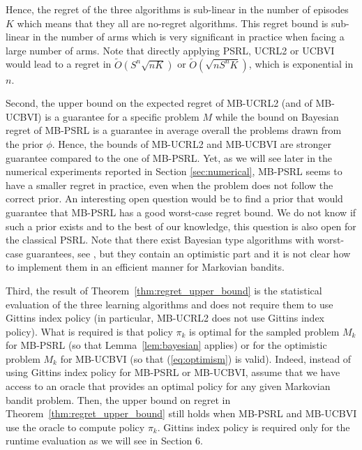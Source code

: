Hence, the regret of the three algorithms is sub-linear in the number of episodes $K$ which means that they all  are no-regret algorithms. This regret bound is sub-linear in the number of arms which is very significant in practice when facing a large number of arms. Note that directly applying PSRL, UCRL2 or UCBVI would lead to a regret in   $\tilde{O}\left(S^n\sqrt{nK}\right)$ or $\tilde{O}\left(\sqrt{nS^nK}\right)$,  which is exponential in $n$.

Second, the upper bound on the expected regret of MB-UCRL2 (and of MB-UCBVI) is a guarantee for a specific problem $M$ while the bound on Bayesian regret of MB-PSRL is a guarantee in average overall the problems drawn from the prior $\phi$. Hence, the bounds of MB-UCRL2 and MB-UCBVI are stronger guarantee compared to the one of MB-PSRL.  Yet, as we will see later in the numerical experiments reported in Section \ref{sec:numerical}, MB-PSRL seems to have a smaller regret in practice, even when the problem does not follow the correct prior.
An interesting open question would be to find a prior that would guarantee that MB-PSRL has a good worst-case regret bound. We do not know if such a prior exists and to the best of our knowledge, this question is also open for the classical PSRL. Note that there exist Bayesian type algorithms with worst-case guarantees, see \eg, \cite{ishfaq2021randomized,agrawal2021improved,wang2020reinforcement,agrawal2017posterior} but they contain an optimistic part and it is not clear how to implement them in an efficient manner for Markovian bandits.

Third, the result of Theorem~\ref{thm:regret_upper_bound} is the statistical evaluation of the three learning algorithms and does not require them to use Gittins index policy (in particular, MB-UCRL2 does not use Gittins index policy).
What is required is that policy $\pi_k$ is optimal for the sampled problem $M_k$ for MB-PSRL (so that Lemma~\ref{lem:bayesian} applies) or for the optimistic problem $M_k$ for MB-UCBVI (so that (\ref{eq:optimism}) is valid).
Indeed, instead of using Gittins index policy for MB-PSRL or MB-UCBVI, assume that we have access to an oracle that provides an optimal policy for any given Markovian bandit problem.
Then, the upper bound on regret in Theorem~\ref{thm:regret_upper_bound} still holds when MB-PSRL and MB-UCBVI use the oracle to compute policy $\pi_k$.
Gittins index policy is required only for the runtime evaluation as we will see in Section 6.

